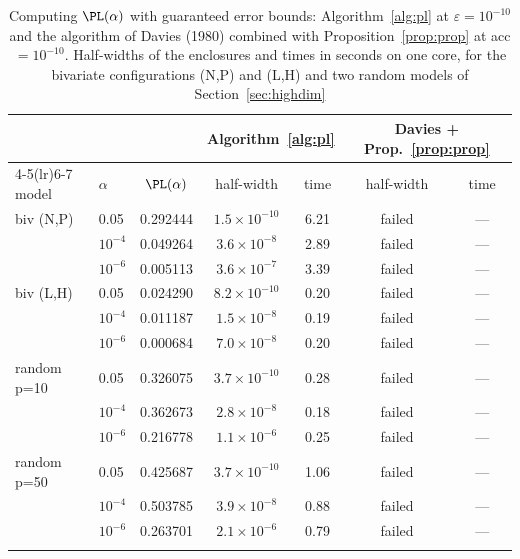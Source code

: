 \begin{table}[t]
\caption{Computing $\PL(\alpha)$ with guaranteed error bounds: Algorithm~\ref{alg:pl} at $\varepsilon=10^{-10}$ and the algorithm of Davies (1980) combined with Proposition~\ref{prop:prop} at acc $=10^{-10}$. Half-widths of the enclosures and times in seconds on one core, for the bivariate configurations (N,P) and (L,H) and two random models of Section~\ref{sec:highdim}}\label{tab:benchcompact}
\footnotesize\setlength{\tabcolsep}{4pt}
\begin{tabular*}{\textwidth}{@{\extracolsep\fill}llccccc@{}}
\toprule
 & & & \multicolumn{2}{c}{Algorithm~\ref{alg:pl}} & \multicolumn{2}{c}{Davies + Prop.~\ref{prop:prop}}\\
\cmidrule(lr){4-5}\cmidrule(lr){6-7}
model & $\alpha$ & $\PL(\alpha)$ & half-width & time & half-width & time\\
\midrule
biv (N,P) & 0.05 & 0.292444 & $1.5\times10^{-10}$ & 6.21 & failed & --- \\
 & $10^{-4}$ & 0.049264 & $3.6\times10^{-8}$ & 2.89 & failed & --- \\
 & $10^{-6}$ & 0.005113 & $3.6\times10^{-7}$ & 3.39 & failed & --- \\
\midrule
biv (L,H) & 0.05 & 0.024290 & $8.2\times10^{-10}$ & 0.20 & failed & --- \\
 & $10^{-4}$ & 0.011187 & $1.5\times10^{-8}$ & 0.19 & failed & --- \\
 & $10^{-6}$ & 0.000684 & $7.0\times10^{-8}$ & 0.20 & failed & --- \\
\midrule
random p=10 & 0.05 & 0.326075 & $3.7\times10^{-10}$ & 0.28 & failed & --- \\
 & $10^{-4}$ & 0.362673 & $2.8\times10^{-8}$ & 0.18 & failed & --- \\
 & $10^{-6}$ & 0.216778 & $1.1\times10^{-6}$ & 0.25 & failed & --- \\
\midrule
random p=50 & 0.05 & 0.425687 & $3.7\times10^{-10}$ & 1.06 & failed & --- \\
 & $10^{-4}$ & 0.503785 & $3.9\times10^{-8}$ & 0.88 & failed & --- \\
 & $10^{-6}$ & 0.263701 & $2.1\times10^{-6}$ & 0.79 & failed & --- \\
\botrule
\end{tabular*}
\end{table}
